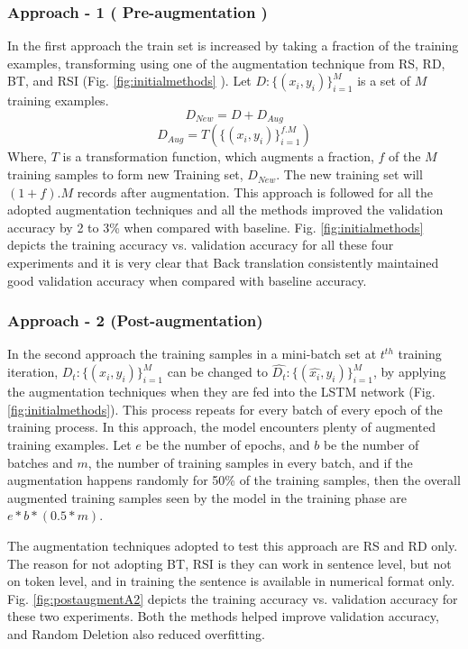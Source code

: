 \documentclass{article}
\begin{document}
\subsubsection{Approach - 1 ( Pre-augmentation )}
In the first approach the train set is increased by taking a fraction of the training examples, transforming using one of the augmentation technique from RS, RD, BT, and RSI (Fig. \ref{fig:initialmethods} ). Let $D : \{(x_i, y_i)\}_{i=1}^M$ is a set of $M$ training examples.
\begin{equation}
D_{New} = D + D_{Aug}
\end{equation}
\begin{equation}
D_{Aug} = T(\{(x_i, y_i)\}_{i=1}^{f.M})
\end{equation}
Where, $T$ is a transformation function, which augments a fraction, $f$ of the $M$ training samples to form new Training set, $D_{New}$. The new training set will $(1+f).M$ records after augmentation. This approach is followed for all the adopted augmentation techniques and all the methods improved the validation accuracy by 2 to 3\% when compared with baseline. Fig. \ref{fig:initialmethods} depicts the training accuracy vs. validation accuracy for all these four experiments and it is very clear that Back translation consistently maintained good validation accuracy when compared with baseline accuracy.

\subsubsection{Approach - 2 (Post-augmentation)}
In the second approach the training samples in a mini-batch set at $t^{th}$ training iteration, $D_t : \{(x_i, y_i)\}_{i=1}^M$  can be changed to $\hat{D_t} : \{(\hat{x_i}, y_i)\}_{i=1}^M$, by applying the augmentation techniques when they are fed into the LSTM network (Fig. \ref{fig:initialmethods}). This process repeats for every batch of every epoch of the training process. In this approach, the model encounters plenty of augmented training examples. 
Let $e$ be the number of epochs, and $b$ be the number of batches and $m$, the number of training samples in every batch, and if the augmentation happens randomly for 50\% of the training samples, then the overall augmented training samples seen by the model in the training phase are $e * b * (0.5 * m)$.

The augmentation techniques adopted to test this approach are RS and RD only. The reason for not adopting BT, RSI is they can work in sentence level, but not on token level, and in training the sentence is available in numerical format only. Fig. \ref{fig:postaugmentA2} depicts the training accuracy vs. validation accuracy for these two experiments. Both the methods helped improve validation accuracy, and Random Deletion also reduced overfitting.
\end{document}
